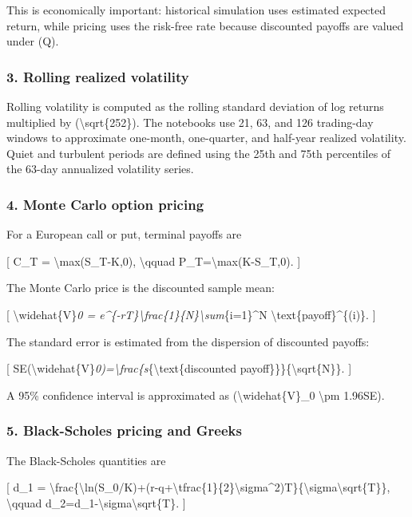 \documentclass[
  11pt,
]{article}
\begin{document}
This is economically important: historical simulation uses estimated expected return, while pricing uses the risk-free rate because discounted payoffs are valued under (Q).

\subsubsection{3. Rolling realized volatility}\label{3-rolling-realized-volatility}

Rolling volatility is computed as the rolling standard deviation of log returns multiplied by (\textbackslash sqrt\{252\}). The notebooks use 21, 63, and 126 trading-day windows to approximate one-month, one-quarter, and half-year realized volatility. Quiet and turbulent periods are defined using the 25th and 75th percentiles of the 63-day annualized volatility series.

\subsubsection{4. Monte Carlo option pricing}\label{4-monte-carlo-option-pricing}

For a European call or put, terminal payoffs are

{[} C\_T = \textbackslash max(S\_T-K,0), \textbackslash qquad P\_T=\textbackslash max(K-S\_T,0). {]}

The Monte Carlo price is the discounted sample mean:

{[} \textbackslash widehat\{V\}\emph{0 = e\^{}\{-rT\}\textbackslash frac\{1\}\{N\}\textbackslash sum}\{i=1\}\^{}N \textbackslash text\{payoff\}\^{}\{(i)\}. {]}

The standard error is estimated from the dispersion of discounted payoffs:

{[} SE(\textbackslash widehat\{V\}\emph{0)=\textbackslash frac\{s}\{\textbackslash text\{discounted payoff\}\}\}\{\textbackslash sqrt\{N\}\}. {]}

A 95\% confidence interval is approximated as (\textbackslash widehat\{V\}\_0 \textbackslash pm 1.96SE).

\subsubsection{5. Black-Scholes pricing and Greeks}\label{5-black-scholes-pricing-and-greeks}

The Black-Scholes quantities are

{[} d\_1 = \textbackslash frac\{\textbackslash ln(S\_0/K)+(r-q+\textbackslash tfrac\{1\}\{2\}\textbackslash sigma\^{}2)T\}\{\textbackslash sigma\textbackslash sqrt\{T\}\}, \textbackslash qquad d\_2=d\_1-\textbackslash sigma\textbackslash sqrt\{T\}. {]}
\end{document}
